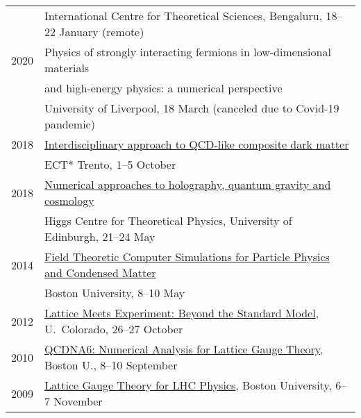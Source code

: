 \documentclass[10 pt]{article}
\begin{document}
\begin{tabular}[t]{cl}
       & International Centre for Theoretical Sciences, Bengaluru, 18--22 January (remote)                                                                                           \\[6 pt]
  2020 & Physics of strongly interacting fermions in low-dimensional materials                                                                                                       \\
       & \hfill and high-energy physics: a numerical perspective                                                                                                                     \\
       & University of Liverpool, 18 March (canceled due to Covid-19 pandemic)                                                                                                       \\[6 pt]
  2018 & \href{https://www.ectstar.eu/workshops/interdisciplinary-approach-to-qcd-like-composite-dark-matter/}{Interdisciplinary approach to QCD-like composite dark matter}         \\
       & ECT* Trento, 1--5 October                                                                                                                                                   \\[6 pt]
  2018 & \href{https://higgs.ph.ed.ac.uk/workshops/numerical-approaches-holography-quantum-gravity-and-cosmology}{Numerical approaches to holography, quantum gravity and cosmology} \\
       & Higgs Centre for Theoretical Physics, University of Edinburgh, 21--24 May                                                                                                   \\[6 pt]
  2014 & \href{http://blogs.bu.edu/ppcm/}{Field Theoretic Computer Simulations for Particle Physics and Condensed Matter}                                                            \\
       & Boston University, 8--10 May                                                                                                                                                \\[6 pt]
  2012 & \href{http://www.maths.liv.ac.uk/TheorPhys/people/staff/schaich/lat-exp-2012/}{Lattice Meets Experiment: Beyond the Standard Model}, U.~Colorado, 26--27 October            \\[6 pt]
  2010 & \href{http://www.maths.liv.ac.uk/TheorPhys/people/staff/schaich/QCDNA6/}{QCDNA6: Numerical Analysis for Lattice Gauge Theory}, Boston U., 8--10 September                   \\[6 pt]
  2009 & \href{http://www.maths.liv.ac.uk/TheorPhys/people/staff/schaich/LGTforLHC2009/}{Lattice Gauge Theory for LHC Physics}, Boston University, 6--7 November                     \\
\end{tabular}
\end{document}
